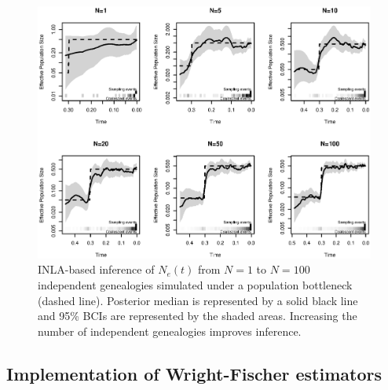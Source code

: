 \documentclass[english,titlepage]{article}
\begin{document}
\begin{figure}
\begin{center}
      \includegraphics[scale=0.8]{Figures/Bottle_20_independent.eps}    \end{center}
      \caption{\small{INLA-based inference of $N_{e}(t)$ from $N=1$ to $N=100$ independent genealogies simulated under a population bottleneck (dashed line). Posterior median is represented by a solid black line and 95\% BCIs are represented by the shaded areas. Increasing the number of independent genealogies improves inference.}}

\end{figure}
 





\subsection*{Implementation of Wright-Fischer estimators}
\end{document}
